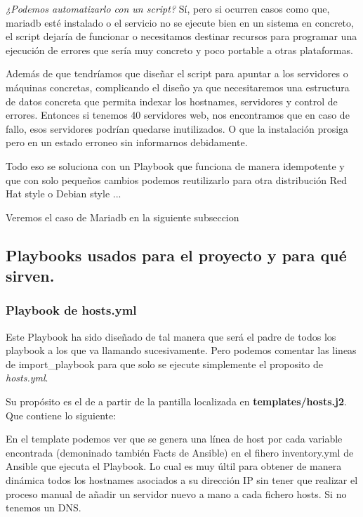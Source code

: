 \emph{¿Podemos automatizarlo con un script?} Sí, pero si ocurren casos como que, mariadb esté instalado o el servicio no se ejecute bien en un sistema en concreto, el script dejaría de funcionar o necesitamos destinar recursos para programar una ejecución de errores
que sería muy concreto y poco portable a otras plataformas.

\vspace{5mm}

Además de que tendríamos que diseñar el script para apuntar a los servidores o máquinas concretas, complicando el diseño ya que necesitaremos una estructura de datos concreta que permita indexar los hostnames, servidores y control de errores. Entonces si tenemos 40 servidores web, nos encontramos que en caso de fallo, esos servidores podrían quedarse inutilizados.
O que la instalación prosiga pero en un estado erroneo sin informarnos debidamente.

\vspace{5mm}

Todo eso se soluciona con un Playbook que funciona de manera idempotente y que con solo pequeños cambios podemos reutilizarlo para otra distribución Red Hat style o Debian style ...

Veremos el caso de Mariadb en la siguiente subseccion

\subsection{Playbooks usados para el proyecto y para qué sirven.}

\subsubsection{Playbook de hosts.yml}

Este Playbook ha sido diseñado de tal manera que será el padre de todos los playbook a los que va llamando sucesivamente. Pero podemos comentar las lineas de import\_playbook para que solo se ejecute simplemente el proposito de \emph{hosts.yml}.

Su propósito es el de a partir de la pantilla localizada en \textbf{templates/hosts.j2}. Que contiene lo siguiente:


\vspace{5mm}

En el template podemos ver que se genera una línea de host por cada variable encontrada (demoninado también Facts de Ansible) en el fihero inventory.yml de Ansible que ejecuta el Playbook. Lo cual es muy últil para obtener de manera dinámica todos los hostnames asociados a su dirección IP sin tener que realizar el proceso manual de añadir un servidor nuevo a mano a cada fichero hosts. Si no tenemos un DNS.
\vspace{5mm}

